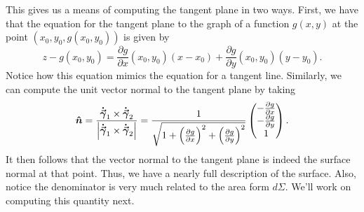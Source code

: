                                         This gives us a means of computing the tangent plane in two ways. First, we have that the equation for the tangent plane to the graph of a function $g(x,y)$ at the point $(x_0,y_0,g(x_0,y_0))$ is given by
                                        \[
                                        z-g(x_0,y_0)=\frac{\partial g}{\partial x}(x_0,y_0)(x-x_0)+\frac{\partial g}{\partial y}(x_0,y_0)(y-y_0).
                                        \]
                                        Notice how this equation mimics the equation for a tangent line.  Similarly, we can compute the unit vector normal to the tangent plane by taking
                                        \[
                                        \boldsymbol{\hat{n}} = \frac{\boldsymbol{\dot{\vec{\gamma}}}_1 \times \boldsymbol{\dot{\vec{\gamma}}}_2}{\left| \boldsymbol{\dot{\vec{\gamma}}}_1 \times \boldsymbol{\dot{\vec{\gamma}}}_2\right|} = \frac{1}{\sqrt{1+\left(\frac{\partial g}{\partial x}\right)^2 + \left(\frac{\partial g}{\partial y}\right)^2}} \begin{pmatrix} -\frac{\partial g}{\partial x} \\ -\frac{\partial g}{\partial y} \\ 1 \end{pmatrix}.
                                        \]
                                     	It then follows that the vector normal to the tangent plane is indeed the surface normal at that point.  Thus, we have a nearly full description of the surface. Also, notice the denominator is very much related to the area form $d\Sigma$.  We'll work on computing this quantity next.
                                                                                
